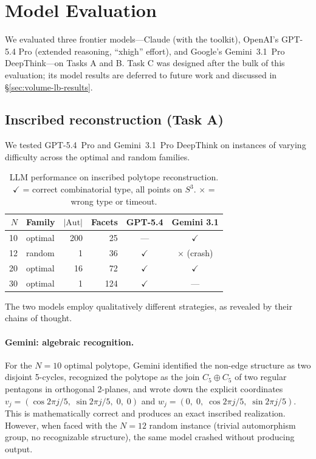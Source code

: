 \documentclass[11pt]{article}
\begin{document}
\section{Model Evaluation}

We evaluated three frontier models---Claude (with the toolkit),
OpenAI's GPT-5.4 Pro (extended reasoning, ``xhigh'' effort), and
Google's Gemini~3.1~Pro DeepThink---on Tasks A and B.  Task C was
designed after the bulk of this evaluation; its model results are
deferred to future work and discussed in
\S\ref{sec:volume-lb-results}.

\subsection{Inscribed reconstruction (Task A)}
\label{sec:reconstruction-results}

We tested GPT-5.4~Pro and Gemini~3.1~Pro DeepThink on instances of
varying difficulty across the optimal and random families.

\begin{table}[ht]
\centering
\caption{LLM performance on inscribed polytope reconstruction.
$\checkmark$ = correct combinatorial type, all points on $S^3$.
$\times$ = wrong type or timeout.}
\label{tab:llm_results}
\smallskip
\begin{tabular}{r l r r c c}
\toprule
$N$ & Family & $|\mathrm{Aut}|$ & Facets & GPT-5.4 & Gemini 3.1 \\
\midrule
10 & optimal & 200  & 25  & ---          & $\checkmark$ \\
12 & random  & 1    & 36  & $\checkmark$ & $\times$ (crash) \\
20 & optimal & 16   & 72  & $\checkmark$ & $\checkmark$ \\
30 & optimal & 1    & 124 & $\checkmark$ & --- \\
\bottomrule
\end{tabular}
\end{table}

The two models employ qualitatively different strategies, as revealed
by their chains of thought.

\paragraph{Gemini: algebraic recognition.}
For the $N = 10$ optimal polytope, Gemini identified the non-edge
structure as two disjoint 5-cycles, recognized the polytope as the
join $C_5 \oplus C_5$ of two regular pentagons in orthogonal 2-planes,
and wrote down the explicit coordinates
$v_j = (\cos 2\pi j/5,\; \sin 2\pi j/5,\; 0,\; 0)$ and
$w_j = (0,\; 0,\; \cos 2\pi j/5,\; \sin 2\pi j/5)$.
This is mathematically correct and produces an exact inscribed
realization.  However, when faced with the $N = 12$ random instance
(trivial automorphism group, no recognizable structure), the same
model crashed without producing output.
\end{document}

